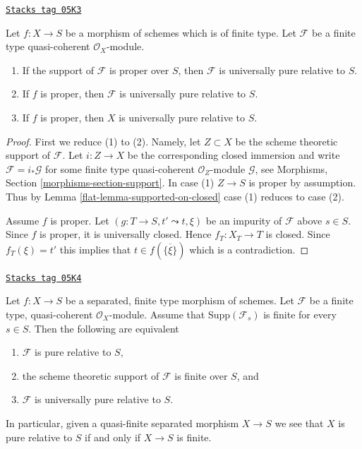\begin{lemma}
\label{flat-lemma-proper-pure}
\href{https://stacks.math.columbia.edu/tag/05K3}{\texttt{Stacks tag 05K3}}

Let $f : X \to S$ be a morphism of schemes which is of finite type.
Let $\mathcal{F}$ be a finite type quasi-coherent $\mathcal{O}_X$-module.
\begin{enumerate}
\item If the support of $\mathcal{F}$ is proper over $S$, then
$\mathcal{F}$ is universally pure relative to $S$.
\item If $f$ is proper, then
$\mathcal{F}$ is universally pure relative to $S$.
\item If $f$ is proper, then $X$ is universally pure relative to $S$.
\end{enumerate}
\end{lemma}

\begin{proof}

First we reduce (1) to (2). Namely, let $Z \subset X$ be the
scheme theoretic support of $\mathcal{F}$. Let $i : Z \to X$
be the corresponding closed immersion and write
$\mathcal{F} = i_*\mathcal{G}$ for some finite type quasi-coherent
$\mathcal{O}_Z$-module $\mathcal{G}$, see
Morphisms, Section \ref{morphisms-section-support}.
In case (1) $Z \to S$ is proper by assumption.
Thus by Lemma \ref{flat-lemma-supported-on-closed} case (1) reduces to case (2).

\medskip\noindent
Assume $f$ is proper.
Let $(g : T \to S, t' \leadsto t, \xi)$ be an impurity of $\mathcal{F}$
above $s \in S$. Since $f$ is proper, it is universally closed. Hence
$f_T : X_T \to T$ is closed. Since $f_T(\xi) = t'$ this implies that
$t \in f(\overline{\{\xi\}})$ which is a contradiction.
\end{proof}

\begin{lemma}
\label{flat-lemma-quasi-finite-pure}
\href{https://stacks.math.columbia.edu/tag/05K4}{\texttt{Stacks tag 05K4}}

Let $f : X \to S$ be a separated, finite type morphism of schemes.
Let $\mathcal{F}$ be a finite type, quasi-coherent $\mathcal{O}_X$-module.
Assume that $\text{Supp}(\mathcal{F}_s)$ is finite for every $s \in S$.
Then the following are equivalent
\begin{enumerate}
\item $\mathcal{F}$ is pure relative to $S$,
\item the scheme theoretic support of $\mathcal{F}$ is finite over $S$, and
\item $\mathcal{F}$ is universally pure relative to $S$.
\end{enumerate}
In particular, given a quasi-finite separated morphism $X \to S$ we see
that $X$ is pure relative to $S$ if and only if $X \to S$ is finite.
\end{lemma}

